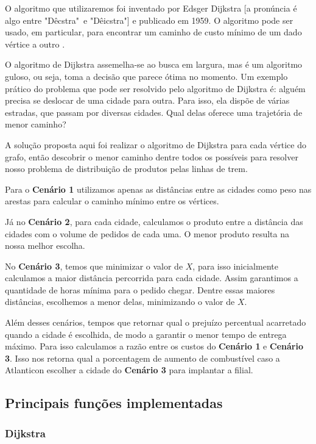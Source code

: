 \documentclass[12pt]{article}
\begin{document}
	O algoritmo que utilizaremos foi inventado por Edsger Dijkstra [a pronúncia é algo entre "Dêcstra"\ e "Dêicstra"] e publicado em 1959. O algoritmo pode ser usado, em particular, para encontrar um caminho de custo mínimo de um dado vértice a outro \cite{sedgewick}.

	O algoritmo de Dijkstra assemelha-se ao busca em largura, mas é um algoritmo guloso, ou seja, toma a decisão que parece ótima no momento. Um exemplo prático do problema que pode ser resolvido pelo algoritmo de Dijkstra é: alguém precisa se deslocar de uma cidade para outra. Para isso, ela dispõe de várias estradas, que passam por diversas cidades. Qual delas oferece uma trajetória de menor caminho? \cite{wiki}

	A solução proposta aqui foi realizar o algoritmo de Dijkstra para cada vértice do grafo, então descobrir o menor caminho dentre todos os possíveis para resolver nosso problema de distribuição de produtos pelas linhas de trem.

	Para o \textbf{Cenário 1} utilizamos apenas as distâncias entre as cidades como peso nas arestas para calcular o caminho mínimo entre os vértices.

	Já no \textbf{Cenário 2}, para cada cidade, calculamos o produto entre a distância das cidades com o volume de pedidos de cada uma. O menor produto resulta na nossa melhor escolha.

	No \textbf{Cenário 3}, temos que minimizar o valor de $X$, para isso inicialmente calculamos a maior distância percorrida para cada cidade. Assim garantimos a quantidade de horas mínima para o pedido chegar. Dentre essas maiores distâncias, escolhemos a menor delas, minimizando o valor de $X$.

	Além desses cenários, tempos que retornar qual o prejuízo percentual acarretado quando a cidade é escolhida, de modo a garantir o menor tempo de entrega máximo. Para isso calculamos a razão entre os custos do \textbf{Cenário 1} e \textbf{Cenário 3}. Isso nos retorna qual a porcentagem de aumento de combustível caso a Atlanticon escolher a cidade do \textbf{Cenário 3} para implantar a filial.

\subsection{Principais funções implementadas}

\subsubsection{Dijkstra}
\end{document}
